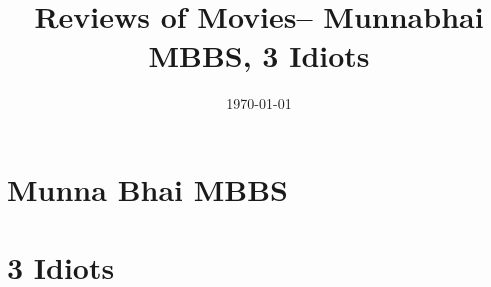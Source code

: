 \documentclass{article}
\title{Reviews of Movies-- Munnabhai MBBS, 3 Idiots}
\date{\today}
\begin{document}
\maketitle

\section{Munna Bhai MBBS}





\section{3 Idiots}
\end{document}
